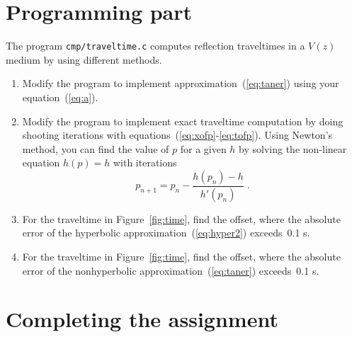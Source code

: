 {\small }

\newpage


\section{Programming part}


The program \texttt{cmp/traveltime.c} computes reflection traveltimes
in a $V(z)$ medium by using different methods. 

\begin{enumerate}
\item Modify the program to implement approximation~(\ref{eq:taner}) using your equation~(\ref{eq:a}).
\item Modify the program to implement exact traveltime computation by doing shooting iterations with equations~(\ref{eq:xofp}-\ref{eq:tofp}). 
Using Newton's method, you can find the value of $p$ for a given $h$ by solving the non-linear equation $h(p)=h$ with iterations
\begin{equation}
\label{eq:newton}
p_{n+1} = p_n - \frac{h(p_n)-h}{h'(p_n)}\;.
\end{equation}
\item For the traveltime in Figure~\ref{fig:time}, find the offset, where the absolute error of the hyperbolic approximation~(\ref{eq:hyper2}) exceeds~0.1 s. 
\item For the traveltime in Figure~\ref{fig:time}, find the offset, where the absolute error of the nonhyperbolic approximation~(\ref{eq:taner}) exceeds~0.1 s. 
\end{enumerate}


\lstset{language=c,numbers=left,numberstyle=\tiny,showstringspaces=false}


\newpage

\section{Completing the assignment}

